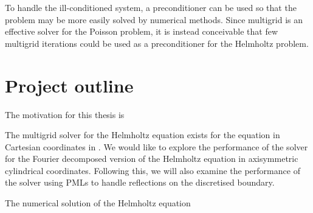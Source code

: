 To handle the ill-conditioned system, a preconditioner can be used so that the problem may be more easily solved by numerical methods.
Since multigrid is an effective solver for the Poisson problem, it is instead conceivable that few multigrid iterations could be used as a preconditioner for the Helmholtz problem.







\section{Project outline}

\iffalse
What is each chapter doing? What do we hope to accomplish? 
\fi

The motivation for this thesis is 

The multigrid solver for the Helmholtz equation exists for the equation in Cartesian coordinates in \oomph.
We would like to explore the performance of the solver for the Fourier decomposed version of the Helmholtz equation in axisymmetric cylindrical coordinates.
Following this, we will also examine the performance of the solver using PMLs to handle reflections on the discretised boundary.

The numerical solution of the Helmholtz equation 
